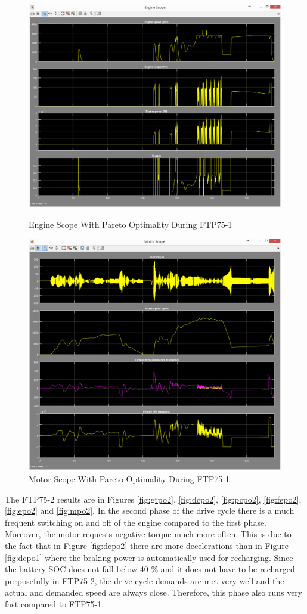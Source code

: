 \begin{figure}[hp]
\centering
\includegraphics[scale=0.46]{figures/Pareto/FTP75-1/engine30Juni}
\caption{Engine Scope With Pareto Optimality During FTP75-1}
\label{fig:epo1}
\includegraphics[scale=0.49]{figures/Pareto/FTP75-1/motor30Juni}
\caption{Motor Scope With Pareto Optimality During FTP75-1}
\label{fig:mpo1}
\end{figure}

The FTP75-2 results are in Figures \ref{fig:gtpo2}, \ref{fig:dcpo2}, \ref{fig:pcpo2}, \ref{fig:fepo2}, \ref{fig:epo2} and \ref{fig:mpo2}. In the second phase of the drive cycle there is a much frequent switching on and off of the engine compared to the first phase. Moreover, the motor requests negative torque much more often. This is due to the fact that in Figure \ref{fig:dcpo2} there are more decelerations than in Figure \ref{fig:dcpo1} where the braking power is automatically used for recharging. Since the battery SOC does not fall below 40 \% and it does not have to be recharged purposefully in FTP75-2, the drive cycle demands are met very well and the actual and demanded speed are always close. Therefore, this phase also runs very fast compared to FTP75-1.

